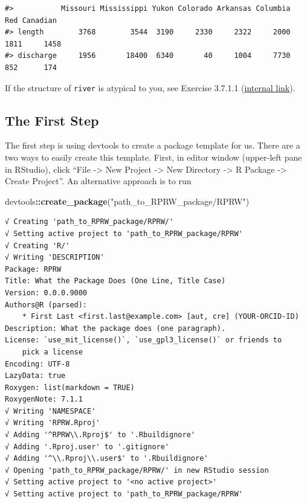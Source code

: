 \documentclass[
]{book}
\newenvironment{Shaded}{\begin{snugshade}}{\end{snugshade}}
\newcommand{\KeywordTok}[1]{\textcolor[rgb]{0.13,0.29,0.53}{\textbf{#1}}}
\newcommand{\NormalTok}[1]{#1}
\newcommand{\OperatorTok}[1]{\textcolor[rgb]{0.81,0.36,0.00}{\textbf{#1}}}
\newcommand{\StringTok}[1]{\textcolor[rgb]{0.31,0.60,0.02}{#1}}
\begin{document}
\begin{verbatim}
#>           Missouri Mississippi Yukon Colorado Arkansas Columbia  Red Canadian
#> length        3768        3544  3190     2330     2322     2000 1811     1458
#> discharge     1956       18400  6340       40     1004     7730  852      174
\end{verbatim}

If the structure of \texttt{river} is atypical to you, see Exercise 3.7.1.1 (\protect\hyperlink{ex-set14}{internal link}).

\hypertarget{first-step}{%
\subsection{The First Step}\label{first-step}}

The first step is using devtools to create a package template for us. There are a two ways to easily create this template. First, in editor window (upper-left pane in RStudio), click ``File -\textgreater{} New Project -\textgreater{} New Directory -\textgreater{} R Package -\textgreater{} Create Project''. An alternative approach is to run

\begin{Shaded}
\begin{Highlighting}[]
\NormalTok{devtools}\OperatorTok{::}\KeywordTok{create_package}\NormalTok{(}\StringTok{"path_to_RPRW_package/RPRW"}\NormalTok{)}
\end{Highlighting}
\end{Shaded}

\begin{verbatim}
√ Creating 'path_to_RPRW_package/RPRW/'
√ Setting active project to 'path_to_RPRW_package/RPRW'
√ Creating 'R/'
√ Writing 'DESCRIPTION'
Package: RPRW
Title: What the Package Does (One Line, Title Case)
Version: 0.0.0.9000
Authors@R (parsed):
    * First Last <first.last@example.com> [aut, cre] (YOUR-ORCID-ID)
Description: What the package does (one paragraph).
License: `use_mit_license()`, `use_gpl3_license()` or friends to
    pick a license
Encoding: UTF-8
LazyData: true
Roxygen: list(markdown = TRUE)
RoxygenNote: 7.1.1
√ Writing 'NAMESPACE'
√ Writing 'RPRW.Rproj'
√ Adding '^RPRW\\.Rproj$' to '.Rbuildignore'
√ Adding '.Rproj.user' to '.gitignore'
√ Adding '^\\.Rproj\\.user$' to '.Rbuildignore'
√ Opening 'path_to_RPRW_package/RPRW/' in new RStudio session
√ Setting active project to '<no active project>'
√ Setting active project to 'path_to_RPRW_package/RPRW'
\end{verbatim}
\end{document}
